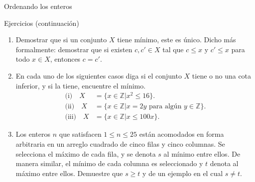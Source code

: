 \documentclass[11pt,spanish,makeidx]{amsbook}
\theoremstyle{definition}
\theoremstyle{remark}
\begin{document}
\begin{section}{Ordenando los enteros}
\begin{subsection}{Ejercicios} {\rm (continuación)}
\begin{enumerate}
\item Demostrar que si un conjunto $X$ tiene mínimo, este es único. Dicho más formalmente: demostrar que si existen $c,c' \in X$ tal que  $c\le x$ y $c'\le x$ para todo $x \in X$, entonces $c=c'$. 
\item En cada uno de los siguientes casos diga si el conjunto $X$ tiene o no una cota inferior, y si la tiene, encuentre el mínimo.
$$
\begin{aligned}
\text{(i)}\quad X &=\{x \in \mathbb Z | x^2\le 16\}. \\
\text{(ii)}\quad X &=\{x \in \mathbb Z | x=2y \text{\ para algún }
y \in
\mathbb Z\}. \\
\text{(iii)}\quad X &=\{x \in \mathbb Z | x\le 100x\} .
\end{aligned}
$$
\item Los enteros $n$ que satisfacen $1 \le n \le 25$ están acomodados en forma arbitraria en un arreglo cuadrado de cinco filas y cinco columnas. Se selecciona el máximo  de cada fila, y se denota $s$ al mínimo entre ellos. De manera similar, el mínimo de cada columna es seleccionado y $t$ denota al máximo entre ellos. Demuestre que $s\ge t$ y de un ejemplo en el cual $s\not=t$.
\end{enumerate}
\end{subsection}

\end{section}
\end{document}
